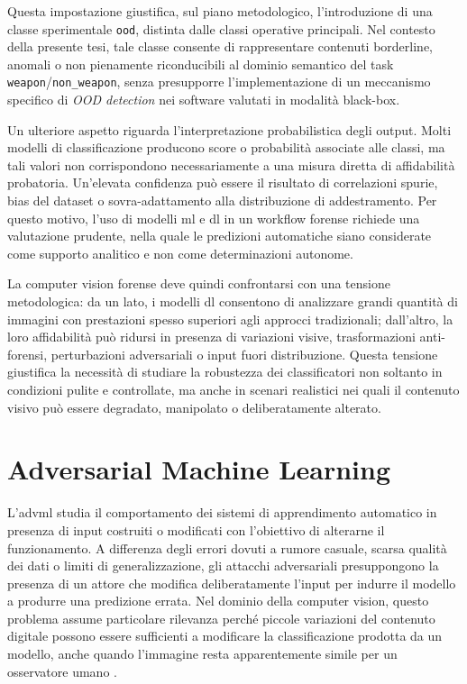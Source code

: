 Questa impostazione giustifica, sul piano metodologico, l'introduzione di una classe sperimentale \texttt{ood}, distinta dalle classi operative principali. Nel contesto della presente tesi, tale classe consente di rappresentare contenuti borderline, anomali o non pienamente riconducibili al dominio semantico del task \texttt{weapon}/\texttt{non\_weapon}, senza presupporre l'implementazione di un meccanismo specifico di \textit{OOD detection} nei software valutati in modalità black-box.

Un ulteriore aspetto riguarda l'interpretazione probabilistica degli output. Molti modelli di classificazione producono score o probabilità associate alle classi, ma tali valori non corrispondono necessariamente a una misura diretta di affidabilità probatoria. Un'elevata confidenza può essere il risultato di correlazioni spurie, bias del dataset o sovra-adattamento alla distribuzione di addestramento. Per questo motivo, l'uso di modelli \gls{ml} e \gls{dl} in un workflow forense richiede una valutazione prudente, nella quale le predizioni automatiche siano considerate come supporto analitico e non come determinazioni autonome.

La computer vision forense deve quindi confrontarsi con una tensione metodologica: da un lato, i modelli \gls{dl} consentono di analizzare grandi quantità di immagini con prestazioni spesso superiori agli approcci tradizionali; dall'altro, la loro affidabilità può ridursi in presenza di variazioni visive, trasformazioni anti-forensi, perturbazioni adversariali o input fuori distribuzione. Questa tensione giustifica la necessità di studiare la robustezza dei classificatori non soltanto in condizioni pulite e controllate, ma anche in scenari realistici nei quali il contenuto visivo può essere degradato, manipolato o deliberatamente alterato.


\section{Adversarial Machine Learning}
\label{sec:background_adversarial_ml}
L'\gls{advml} studia il comportamento dei sistemi di apprendimento automatico in presenza di input costruiti o modificati con l'obiettivo di alterarne il funzionamento. A differenza degli errori dovuti a rumore casuale, scarsa qualità dei dati o limiti di generalizzazione, gli attacchi adversariali presuppongono la presenza di un attore che modifica deliberatamente l'input per indurre il modello a produrre una predizione errata. Nel dominio della computer vision, questo problema assume particolare rilevanza perché piccole variazioni del contenuto digitale possono essere sufficienti a modificare la classificazione prodotta da un modello, anche quando l'immagine resta apparentemente simile per un osservatore umano \cite{szegedy2014intriguing,goodfellow2015explaining}.

